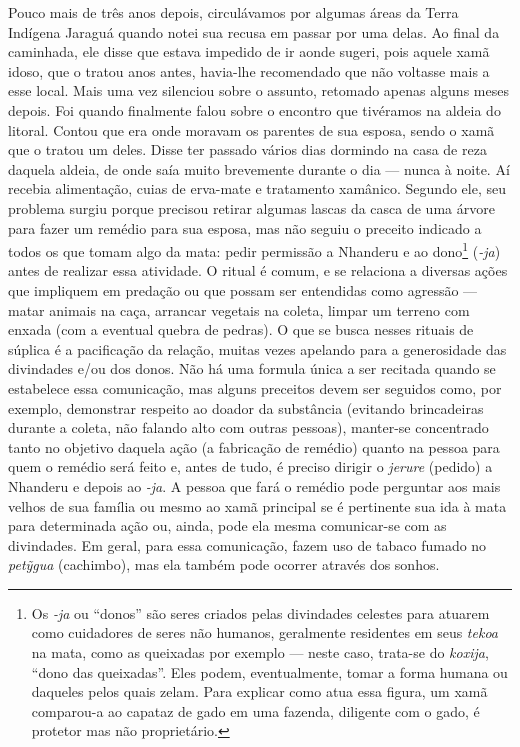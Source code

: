 Pouco mais de três anos depois, circulávamos por algumas áreas da Terra
Indígena Jaraguá quando notei sua recusa em passar por uma delas. Ao
final da caminhada, ele disse que estava impedido de ir aonde sugeri,
pois aquele xamã idoso, que o tratou anos antes, havia-lhe recomendado
que não voltasse mais a esse local. Mais uma vez silenciou sobre o
assunto, retomado apenas alguns meses depois. Foi quando finalmente
falou sobre o encontro que tivéramos na aldeia do litoral. Contou que
era onde moravam os parentes de sua esposa, sendo o xamã que o tratou um
deles. Disse ter passado vários dias dormindo na casa de reza daquela
aldeia, de onde saía muito brevemente durante o dia --- nunca à noite.
Aí recebia alimentação, cuias de erva-mate e tratamento xamânico.
Segundo ele, seu problema surgiu porque precisou retirar algumas lascas
da casca de uma árvore para fazer um remédio para sua esposa, mas não
seguiu o preceito indicado a todos os que tomam algo da mata: pedir
permissão a Nhanderu e ao dono\footnote{Os \emph{-ja} ou ``donos'' são
  seres criados pelas divindades celestes para atuarem como cuidadores
  de seres não humanos, geralmente residentes em seus \emph{tekoa} na
  mata, como as queixadas por exemplo --- neste caso, trata-se do
  \emph{koxija}, ``dono das queixadas''. Eles podem, eventualmente,
  tomar a forma humana ou daqueles pelos quais zelam. Para explicar como
  atua essa figura, um xamã comparou-a ao capataz de gado em uma
  fazenda, diligente com o gado, é protetor mas não proprietário.}
(\emph{-ja}) antes de realizar essa atividade. O ritual é comum, e se
relaciona a diversas ações que impliquem em predação ou que possam ser
entendidas como agressão --- matar animais na caça, arrancar vegetais na
coleta, limpar um terreno com enxada (com a eventual quebra de pedras).
O que se busca nesses rituais de súplica é a pacificação da relação,
muitas vezes apelando para a generosidade das divindades e/ou dos donos.
Não há uma formula única a ser recitada quando se estabelece essa
comunicação, mas alguns preceitos devem ser seguidos como, por exemplo,
demonstrar respeito ao doador da substância (evitando brincadeiras
durante a coleta, não falando alto com outras pessoas), manter-se
concentrado tanto no objetivo daquela ação (a fabricação de remédio)
quanto na pessoa para quem o remédio será feito e, antes de tudo, é
preciso dirigir o \emph{jerure} (pedido) a Nhanderu e depois ao
\emph{-ja}. A pessoa que fará o remédio pode perguntar aos mais velhos
de sua família ou mesmo ao xamã principal se é pertinente sua ida à mata
para determinada ação ou, ainda, pode ela mesma comunicar-se com as
divindades. Em geral, para essa comunicação, fazem uso de tabaco fumado
no \emph{petỹgua} (cachimbo), mas ela também pode ocorrer através dos
sonhos.

